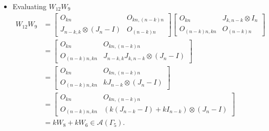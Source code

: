 \begin{itemize}
\item Evaluating $W_{12}W_{9}$
\begin{align*}
    W_{12}W_{9}
    &= \begin{bmatrix}
        O_{kn} & O_{kn, (n-k)n} \\
        J_{n-k, k}\otimes (J_n-I) & O_{(n-k)n}
    \end{bmatrix}
    \begin{bmatrix}
        O_{kn} & J_{k,n-k} \otimes I_n \\
        O_{(n-k)n,kn} & O_{(n-k)n}
    \end{bmatrix}\\
    &= \begin{bmatrix}
        O_{kn} & O_{kn, (n-k)n} \\
        O_{(n-k)n,kn} & J_{n-k, k}J_{k,n-k} \otimes (J_n-I)
    \end{bmatrix}\\
    &= \begin{bmatrix}
        O_{kn} & O_{kn, (n-k)n} \\
        O_{(n-k)n,kn} & kJ_{n-k} \otimes (J_n-I)
    \end{bmatrix}\\
    &= \begin{bmatrix}
        O_{kn} & O_{kn, (n-k)n} \\
        O_{(n-k)n,kn} & (k(J_{n-k}-I)+kI_{n-k}) \otimes (J_n-I)
    \end{bmatrix}\\
    &= kW_8 + kW_6\in\mathcal{A}(\Gamma_5).
\end{align*}


\end{itemize}
